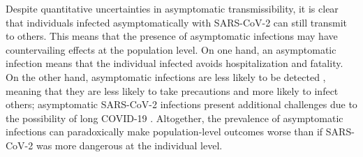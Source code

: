 \documentclass[12pt]{article}
\begin{document}
Despite quantitative uncertainties in asymptomatic transmissibility, it is clear that individuals infected asymptomatically with SARS-CoV-2 can still transmit to others. 
This means that the presence of asymptomatic infections may have countervailing effects at the population level. 
On one hand, an asymptomatic infection means that the individual infected avoids hospitalization and fatality. 
On the other hand, asymptomatic infections are less likely to be detected \citep{fraser2004factors}, meaning that they are less likely to take precautions and more likely to infect others;
asymptomatic SARS-CoV-2 infections present additional challenges due to the possibility of long COVID-19 \citep{xie2022long}.
Altogether, the prevalence of asymptomatic infections can paradoxically make population-level outcomes worse than if SARS-CoV-2 was more dangerous at the individual level.
\end{document}
